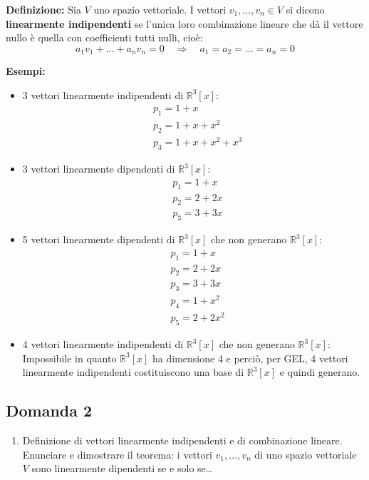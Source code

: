 \documentclass[
  a4paper,
]{article}
\providecommand{\tightlist}{%
  \setlength{\itemsep}{0pt}\setlength{\parskip}{0pt}}
\providecommand{\tightlist}{}
\begin{document}
\textbf{Definizione:} Sia \(V\) uno spazio vettoriale. I vettori
\(v_1, ..., v_n \in V\) si dicono \textbf{linearmente indipendenti} se
l'unica loro combinazione lineare che dà il vettore nullo è quella con
coefficienti tutti nulli, cioè: \[
a_1v_1 + ... + a_n v_n = \underline{0} \quad\Longrightarrow\quad a_1 = a_2 = ... = a_n = 0
\]

\textbf{Esempi:}

\begin{itemize}
\tightlist
\item
  3 vettori linearmente indipendenti di \(\mathbb{R}^3[x]\): \[
    \begin{aligned}
    &p_1 = 1 + x \\
    &p_2 = 1 + x + x^2 \\
    &p_3 = 1 + x + x^2 + x^3
    \end{aligned}
    \]
\item
  3 vettori linearmente dipendenti di \(\mathbb{R}^3[x]\): \[
    \begin{aligned}
    &p_1 = 1 + x \\
    &p_2 = 2 + 2x \\
    &p_3 = 3 + 3x 
    \end{aligned}
    \]
\item
  5 vettori linearmente dipendenti di \(\mathbb{R}^3[x]\) che non
  generano \(\mathbb{R}^3[x]\): \[
    \begin{aligned}
    &p_1 = 1 + x \\
    &p_2 = 2 + 2x \\
    &p_3 = 3 + 3x \\
    &p_4 = 1 + x^2 \\
    &p_5 = 2 + 2x^2
    \end{aligned}
    \]
\item
  4 vettori linearmente indipendenti di \(\mathbb{R}^3[x]\) che non
  generano \(\mathbb{R}^3[x]\): Impossibile in quanto
  \(\mathbb{R}^3[x]\) ha dimensione 4 e perciò, per GEL, 4 vettori
  linearmente indipendenti costituiscono una base di \(\mathbb{R}^3[x]\)
  e quindi generano.
\end{itemize}

\hypertarget{domanda-2}{%
\subsection{Domanda 2}\label{domanda-2}}

\begin{observationbox}[Domanda]
\begin{enumerate}
\def\labelenumi{\arabic{enumi}.}
\setcounter{enumi}{1}
\tightlist
\item
  Definizione di vettori linearmente indipendenti e di combinazione
  lineare. Enunciare e dimostrare il teorema: i vettori
  \(v_1,\ldots,v_n\) di uno spazio vettoriale \(V\) sono linearmente
  dipendenti se e solo se\ldots{}
\end{enumerate}
\end{observationbox}
\end{document}
